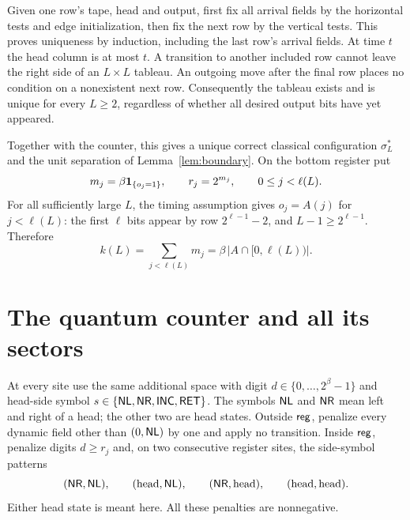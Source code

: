 Given one row's tape, head and output, first fix all arrival fields by the
horizontal tests and edge initialization, then fix the next row by the
vertical tests. This proves uniqueness by induction, including the last
row's arrival fields. At time $t$ the head column is at most $t$.
A transition to another included row cannot leave the right side of an
$L\times L$ tableau. An outgoing move after the final row places no
condition on a nonexistent next row. Consequently the tableau exists and
is unique for every $L\geq2$, regardless of whether all desired output
bits have yet appeared.

Together with the counter, this gives a unique correct classical
configuration $\sigma_L^*$ and the unit separation of
Lemma~\ref{lem:boundary}. On the bottom register put
\begin{equation}\label{eq:radix}
 m_j=\beta\mathbf 1_{\{o_j=1\}},\qquad r_j=2^{m_j},\qquad 0\leq j<\ell(L).
\end{equation}
For all sufficiently large $L$, the timing assumption gives $o_j=A(j)$
for $j<\ell(L)$: the first $\ell$ bits appear by row
$2^{\ell-1}-2$, and $L-1\geq2^{\ell-1}$. Therefore
\begin{equation}\label{eq:k}
 k(L)=\sum_{j<\ell(L)}m_j
     =\beta\,|A\cap[0,\ell(L))|.
\end{equation}

\section{The quantum counter and all its sectors}\label{sec:counter}
At every site use the same additional space with digit
$d\in\{0,\ldots,2^\beta-1\}$ and head-side symbol
$s\in\{\mathsf{NL},\mathsf{NR},\mathsf{INC},\mathsf{RET}\}$. The symbols $\mathsf{NL}$ and $\mathsf{NR}$ mean
left and right of a head; the other two are head states. Outside $\mathsf{reg}$,
penalize every dynamic field other than $(0,\mathsf{NL})$ by one and apply no
transition. Inside $\mathsf{reg}$, penalize digits $d\geq r_j$ and, on two
consecutive register sites, the side-symbol patterns
\[
 (\mathsf{NR},\mathsf{NL}),\qquad (\text{head},\mathsf{NL}),\qquad
 (\mathsf{NR},\text{head}),\qquad (\text{head},\text{head}).
\]
Either head state is meant here. All these penalties are nonnegative.

